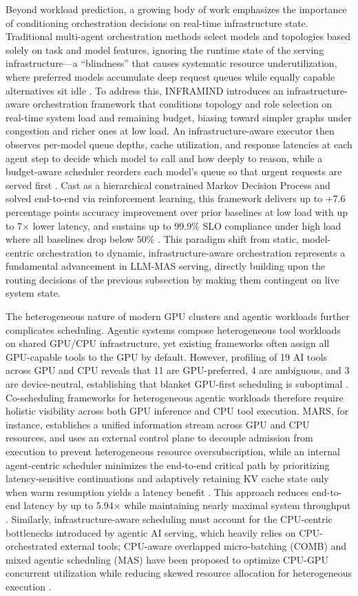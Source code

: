 \documentclass[11pt]{article}
\begin{document}
Beyond workload prediction, a growing body of work emphasizes the importance of conditioning orchestration decisions on real-time infrastructure state. Traditional multi-agent orchestration methods select models and topologies based solely on task and model features, ignoring the runtime state of the serving infrastructure---a ``blindness'' that causes systematic resource underutilization, where preferred models accumulate deep request queues while equally capable alternatives sit idle \cite{ref292}. To address this, INFRAMIND introduces an infrastructure-aware orchestration framework that conditions topology and role selection on real-time system load and remaining budget, biasing toward simpler graphs under congestion and richer ones at low load. An infrastructure-aware executor then observes per-model queue depths, cache utilization, and response latencies at each agent step to decide which model to call and how deeply to reason, while a budget-aware scheduler reorders each model's queue so that urgent requests are served first \cite{ref292}. Cast as a hierarchical constrained Markov Decision Process and solved end-to-end via reinforcement learning, this framework delivers up to +7.6 percentage points accuracy improvement over prior baselines at low load with up to 7× lower latency, and sustains up to 99.9\% SLO compliance under high load where all baselines drop below 50\% \cite{ref292}. This paradigm shift from static, model-centric orchestration to dynamic, infrastructure-aware orchestration represents a fundamental advancement in LLM-MAS serving, directly building upon the routing decisions of the previous subsection by making them contingent on live system state.

The heterogeneous nature of modern GPU clusters and agentic workloads further complicates scheduling. Agentic systems compose heterogeneous tool workloads on shared GPU/CPU infrastructure, yet existing frameworks often assign all GPU-capable tools to the GPU by default. However, profiling of 19 AI tools across GPU and CPU reveals that 11 are GPU-preferred, 4 are ambiguous, and 3 are device-neutral, establishing that blanket GPU-first scheduling is suboptimal \cite{ref296}. Co-scheduling frameworks for heterogeneous agentic workloads therefore require holistic visibility across both GPU inference and CPU tool execution. MARS, for instance, establishes a unified information stream across GPU and CPU resources, and uses an external control plane to decouple admission from execution to prevent heterogeneous resource oversubscription, while an internal agent-centric scheduler minimizes the end-to-end critical path by prioritizing latency-sensitive continuations and adaptively retaining KV cache state only when warm resumption yields a latency benefit \cite{ref295}. This approach reduces end-to-end latency by up to 5.94× while maintaining nearly maximal system throughput \cite{ref295}. Similarly, infrastructure-aware scheduling must account for the CPU-centric bottlenecks introduced by agentic AI serving, which heavily relies on CPU-orchestrated external tools; CPU-aware overlapped micro-batching (COMB) and mixed agentic scheduling (MAS) have been proposed to optimize CPU-GPU concurrent utilization while reducing skewed resource allocation for heterogeneous execution \cite{ref297}.
\end{document}
